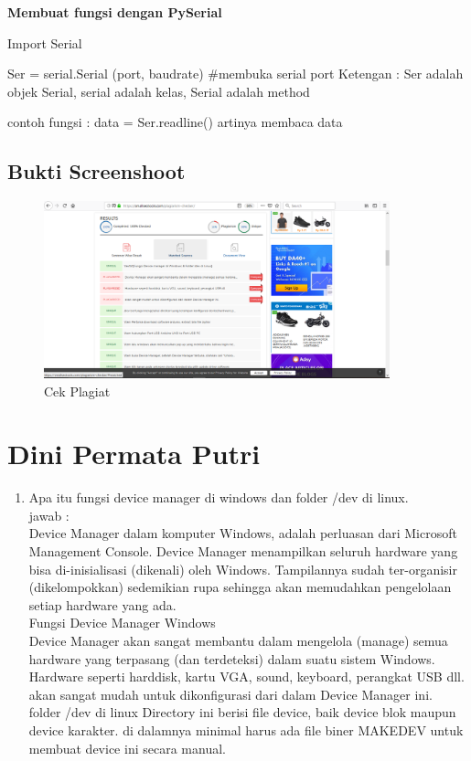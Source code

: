 \begin{itemize}
\textbf{Membuat fungsi dengan PySerial}


 Import Serial

Ser = serial.Serial (port, baudrate) #membuka serial port
Ketengan : Ser adalah objek Serial, serial adalah kelas, Serial adalah method

contoh fungsi : data = Ser.readline() artinya membaca data


\subsection{Bukti Screenshoot}

\begin{figure}[H]
	\includegraphics[width=10cm]{figures/5/1174074/Teori/plagiarisme2.png}
	\centering	
	\caption{Cek Plagiat}
\end{figure}


\section{Dini Permata Putri}
\begin{enumerate}

\item Apa itu fungsi device manager di windows dan folder /dev di linux.\\
jawab : \\
Device Manager dalam komputer Windows, adalah perluasan dari Microsoft Management Console. Device Manager menampilkan seluruh hardware yang bisa di-inisialisasi (dikenali) oleh Windows. Tampilannya sudah ter-organisir (dikelompokkan) sedemikian rupa sehingga akan memudahkan pengelolaan setiap hardware yang ada.\\

Fungsi Device Manager Windows\\
Device Manager akan sangat membantu dalam mengelola (manage) semua hardware yang terpasang (dan terdeteksi) dalam suatu sistem Windows. Hardware seperti harddisk, kartu VGA, sound, keyboard, perangkat USB dll. akan sangat mudah untuk dikonfigurasi dari dalam Device Manager ini.\\
folder /dev di linux
Directory ini berisi file device, baik device blok maupun device karakter. di dalamnya minimal harus ada file biner MAKEDEV untuk membuat device ini secara manual.\\


\end{enumerate}
\end{itemize}

